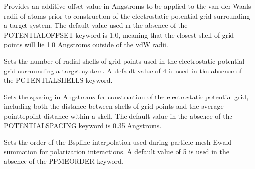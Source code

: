 \documentclass[letterpaper,11pt,english]{sphinxmanual}
\begin{document}
\ignorespaces {}\label{\detokenize{text/keywords:key-potential-offset}}\begin{description}
\sphinxAtStartPar
Provides an additive offset value in Angstroms to be applied to the van der Waals radii of atoms prior to construction of the electrostatic potential grid surrounding a target system. The default value used in the absence of the POTENTIAL\sphinxhyphen{}OFFSET keyword is 1.0, meaning that the closest shell of grid points will lie 1.0 Angstroms outside of the vdW radii.

\end{description}

\ignorespaces {}\label{\detokenize{text/keywords:key-potential-shells}}\begin{description}
\sphinxlineitem{POTENTIAL\sphinxhyphen{}SHELLS {[}integer{[}}
\sphinxAtStartPar
Sets the number of radial shells of grid points used in the electrostatic potential grid surrounding a target system. A default value of 4 is used in the absence of the POTENTIAL\sphinxhyphen{}SHELLS keyword.

\end{description}

\ignorespaces {}\label{\detokenize{text/keywords:key-potential-spacing}}\begin{description}
\sphinxAtStartPar
Sets the spacing in Angstroms for construction of the electrostatic potential grid, including both the distance between shells of grid points and the average point\sphinxhyphen{}to\sphinxhyphen{}point distance within a shell. The default value in the absence of the POTENTIAL\sphinxhyphen{}SPACING keyword is 0.35 Angstroms.

\end{description}

\ignorespaces {}\label{\detokenize{text/keywords:key-ppme-order}}\begin{description}
\sphinxAtStartPar
Sets the order of the B\sphinxhyphen{}spline interpolation used during particle mesh Ewald summation for polarization interactions. A default value of 5 is used in the absence of the PPME\sphinxhyphen{}ORDER keyword.

\end{description}
\end{document}

